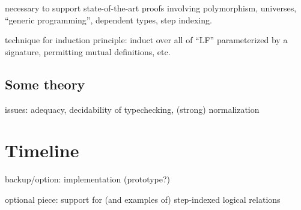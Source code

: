 \documentclass{article}
\begin{document}
necessary to support state-of-the-art proofs involving polymorphism,
universes, ``generic programming'', dependent types, step indexing.

technique for induction principle: induct over all of ``LF''
parameterized by a signature, permitting mutual definitions, etc.
\subsection{Some theory}

issues: adequacy, decidability of typechecking, (strong) normalization
\section{Timeline}
backup/option: implementation (prototype?)

optional piece: support for (and examples of) step-indexed logical relations
\end{document}
